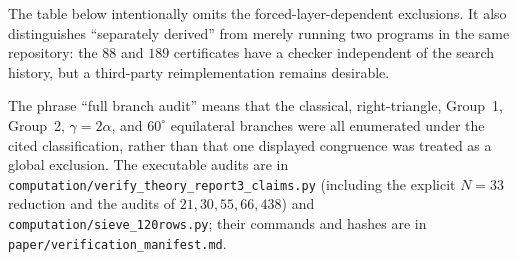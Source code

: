 \documentclass[11pt]{amsart}
\theoremstyle{definition}
\theoremstyle{remark}
\newcommand{\pathcode}[1]{\nolinkurl{#1}}
\begin{document}
The table below intentionally omits the forced-layer-dependent exclusions.  It also
distinguishes ``separately derived'' from merely running two programs in the
same repository: the $88$ and $189$ certificates have a checker independent
of the search history, but a third-party reimplementation remains desirable.

The phrase ``full branch audit'' means that the classical, right-triangle,
Group~1, Group~2, $\gamma=2\alpha$, and $60^\circ$ equilateral branches were
all enumerated under the cited classification, rather than that one displayed
congruence was treated as a global exclusion.  The executable audits are in
\pathcode{computation/verify_theory_report3_claims.py} (including the explicit
$N=33$ reduction and the audits of $21,30,55,66,438$) and
\pathcode{computation/sieve_120rows.py}; their commands and hashes are in
\pathcode{paper/verification_manifest.md}.
\end{document}
